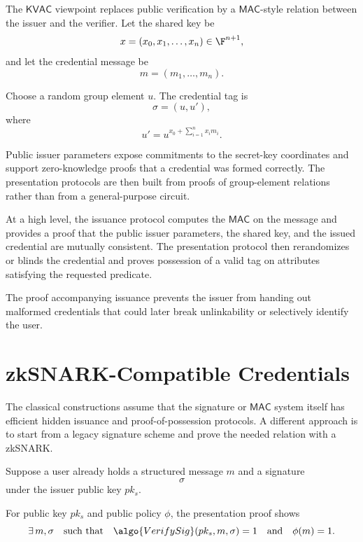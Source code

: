 \documentclass[11pt]{article}
\newcommand{\SigVerify}{\algo{VerifySig}}
\newcommand{\KVAC}{\ensuremath{\mathsf{KVAC}}}
\newcommand{\MAC}{\ensuremath{\mathsf{MAC}}}
\begin{document}
The \KVAC{} viewpoint replaces public verification by a \MAC-style relation
between the issuer and the verifier.  Let the shared key be
\[
  x = (x_0,x_1,\ldots,x_n) \in \F^{n+1},
\]
and let the credential message be
\[
  m = (m_1,\ldots,m_n).
\]

\begin{definition}[Algebraic \MAC]
Choose a random group element $u$.  The credential tag is
\[
  \sigma = (u,u'),
\]
where
\[
  u' = u^{x_0 + \sum_{i=1}^{n} x_i m_i}.
\]
\end{definition}

Public issuer parameters expose commitments to the secret-key coordinates and
support zero-knowledge proofs that a credential was formed correctly.  The
presentation protocols are then built from proofs of group-element relations
rather than from a general-purpose circuit.

At a high level, the issuance protocol computes the \MAC{} on the message and
provides a proof that the public issuer parameters, the shared key, and the
issued credential are mutually consistent.  The presentation protocol then
rerandomizes or blinds the credential and proves possession of a valid tag on
attributes satisfying the requested predicate.

\begin{remark}
The proof accompanying issuance prevents the issuer from handing out malformed
credentials that could later break unlinkability or selectively identify the
user.
\end{remark}

\section{zkSNARK-Compatible Credentials}

The classical constructions assume that the signature or \MAC{} system itself
has efficient hidden issuance and proof-of-possession protocols.  A different
approach is to start from a legacy signature scheme and prove the needed
relation with a zkSNARK.

Suppose a user already holds a structured message $m$ and a signature
\[
  \sigma
\]
under the issuer public key $pk_s$.

\begin{graybox}[title={Legacy-Compatible Proof-of-Possession Relation}]
For public key $pk_s$ and public policy $\phi$, the presentation proof shows
\[
  \exists\, m,\sigma
  \quad\text{such that}\quad
  \SigVerify(pk_s, m, \sigma) = 1
  \quad\text{and}\quad
  \phi(m)=1.
\]
\end{graybox}
\end{document}
